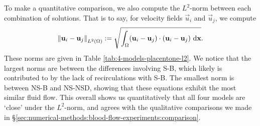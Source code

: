     To make a quantitative comparison, we also compute the $L^2$-norm between each combination of solutions. That is to say, for velocity fields $\vec{u}_i$ and $\vec{u}_j$, we compute
    \begin{equation}
        \norm{\boldsymbol{\mathbf{u}}_i - \boldsymbol{\mathbf{u}}_j}_{L^2(\Omega)} := \sqrt{\int_\Omega (\boldsymbol{\mathbf{u}}_i - \boldsymbol{\mathbf{u}}_j) \cdot (\boldsymbol{\mathbf{u}}_i - \boldsymbol{\mathbf{u}}_j) ~\mathrm{d} \boldsymbol{\mathbf{x}}}.
    \end{equation}
    These norms are given in Table \ref{tab:4-models-placentone-l2}. We notice that the largest norms are between the differences involving S-B, which likely is contributed to by the lack of recirculations with S-B. The smallest norm is between NS-B and NS-NSD, showing that these equations exhibit the most similar fluid flow. This overall shows us quantitatively that all four models are `close' under the $L^2$-norm, and agrees with the qualitative comparisons we made in \S\ref{sec:numerical-methods:blood-flow-experiments:comparison}. 


